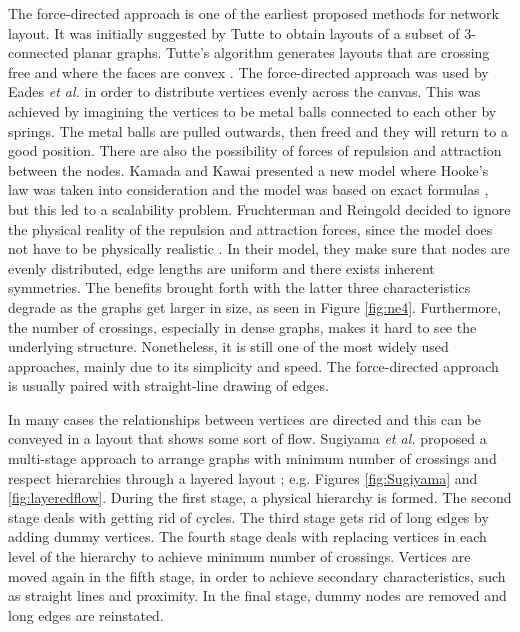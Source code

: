 \documentclass[a4paper,11pt,phdthesis,singlespace,twoside]{cssethesis}
\begin{document}
The force-directed approach is one of the earliest proposed methods for network layout. It was initially suggested by Tutte \cite{tutte1963draw} to obtain layouts of a subset of 3-connected planar graphs. Tutte's algorithm generates layouts that are crossing free and where the faces are convex \cite{kobourov2012spring}. The force-directed approach was used by Eades \emph{et al.} in order to distribute vertices evenly across the canvas. This was achieved by imagining the vertices to be metal balls connected to each other by springs. The metal balls are pulled outwards, then freed and they will return to a good position. There are also the possibility of forces of repulsion and attraction between the nodes. Kamada and Kawai presented a new model where Hooke’s law was taken into consideration and the model was based on exact formulas \cite{kamada1989algorithm}, but this led to a scalability problem. Fruchterman and Reingold decided to ignore the physical reality of the repulsion and attraction forces, since the model does not have to be physically realistic \cite{fruchterman1991graph}. In their model, they make sure that nodes are evenly distributed, edge lengths are uniform and there exists inherent symmetries. 
The benefits brought forth with the latter three characteristics degrade as the graphs get larger in size, as seen in Figure \ref{fig:ne4}. Furthermore, the number of crossings, especially in dense graphs, makes it hard to see the underlying structure. Nonetheless, it is still one of the most widely used approaches, mainly due to its simplicity and speed. The force-directed approach is usually paired with straight-line drawing of edges.

In many cases the relationships between vertices are directed and this can be conveyed in a layout that shows some sort of flow. Sugiyama \emph{et al.} proposed a multi-stage approach to arrange graphs with minimum number of crossings and respect hierarchies through a layered layout \cite{sugiyama1981methods}; e.g. Figures \ref{fig:Sugiyama} and \ref{fig:layeredflow}. During the first stage, a physical hierarchy is formed. The second stage deals with getting rid of cycles. The third stage gets rid of long edges by adding dummy vertices. The fourth stage deals with replacing vertices in each level of the hierarchy to achieve minimum number of crossings. Vertices are moved again in the fifth stage, in order to achieve secondary characteristics, such as straight lines and proximity. In the final stage, dummy nodes are removed and long edges are reinstated.
\end{document}
